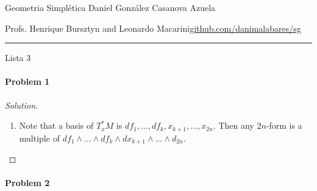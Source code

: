 

%



\begin{minipage}{\textwidth}
	\begin{minipage}{1\textwidth}
		Geometria Simpl\'etica \hfill Daniel González Casanova Azuela
		
		{\small Profs. Henrique Bursztyn and Leonardo Macarini\hfill\href{https://github.com/danimalabares/sg}{github.com/danimalabares/sg}}
	\end{minipage}
\end{minipage}\vspace{.2cm}\hrule

\vspace{10pt}
{\huge Lista 3}

\tableofcontents

\paragraph{Problem 1}

\begin{proof}[Solution]\leavevmode
	\begin{enumerate}[label=\alph*.]
		\item {\color{magenta}Note} that a basis of $T_x^*M$ is $df_1,\ldots,df_k,x_{k+1},\ldots,x_{2n}$. Then any $2n$-form is a multiple of  $df_1\wedge \ldots \wedge df_k\wedge dx_{k+1}\wedge \ldots\wedge d_{2n}$. 
	\end{enumerate}
\end{proof}

\paragraph{Problem 2}

